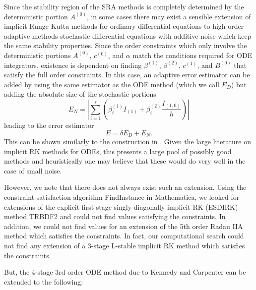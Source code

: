 \documentclass{article}
\begin{document}
Since the stability region of the SRA methods is completely determined
by the deterministic portion $A^{(0)}$, in some cases there may exist
a sensible extension of implicit Runge-Kutta methods for ordinary
differential equations to high order adaptive methods stochastic differential
equations with additive noise which keep the same stability properties.
Since the order constraints which only involve the deterministic portions
$A^{(0)}$, $c^{(0)}$, and $\alpha$ match the conditions required
for ODE integrators, existence is dependent on finding $\beta^{(1)}$,
$\beta^{(2)}$, $c^{(1)}$, and $B^{(0)}$ that satisfy the full order
constraints. In this case, an adaptive error estimator can be added
by using the same estimator as the ODE method (which we call $E_{D}$)
but adding the absolute size of the stochastic portions
\begin{equation}
E_{N}=\left|\sum_{i=1}^{s}\left(\beta_{i}^{(1)}I_{(1)}+\beta_{i}^{(2)}\frac{I_{(1,0)}}{h}\right)\right|\label{eq:EN}
\end{equation}
leading to the error estimator
\begin{equation}
E=\delta E_{D}+E_{N}.\label{eq:E}
\end{equation}
This can be shown similarly to the construction in \cite{RN3787}.
Given the large literature on implicit RK methods for ODEs, this presents
a large pool of possibly good methods and heuristically one may believe
that these would do very well in the case of small noise.

However, we note that there does not always exist such an extension.
Using the constraint-satisfaction algorithm FindInstance in Mathematica,
we looked for extensions of the explicit first stage singly-diagonally
implicit RK (ESDIRK) method TRBDF2 \cite{RN3793} and could not find
values satisfying the constraints. In addition, we could not find
values for an extension of the 5th order Radau IIA method \cite{RN3794,RN3790}
which satisfies the constraints. In fact, our computational search
could not find any extension of a 3-stage L-stable implicit RK method
which satisfies the constraints.

But, the 4-stage 3rd order ODE method due to Kennedy and Carpenter
\cite{RN3792} can be extended to the following:
\end{document}
